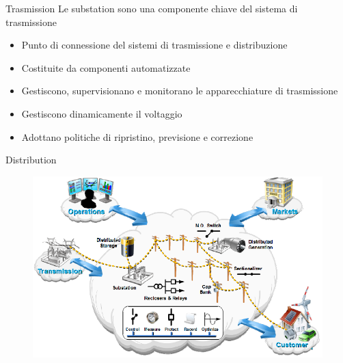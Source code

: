 \begin{frame}[fragile]{Trasmission}
	Le substation sono una componente chiave del sistema di trasmissione
	\begin{itemize}[<+- | alert@+>]
		\item Punto di connessione del sistemi di trasmissione e distribuzione
		\item Costituite da componenti automatizzate %
		\item Gestiscono, supervisionano e monitorano le apparecchiature di trasmissione %
		\item Gestiscono dinamicamente il voltaggio			
		\item Adottano politiche di ripristino, previsione e correzione   
	\end{itemize}
\end{frame}


\begin{frame}[fragile]{Distribution}
	\begin{figure}[h] 
		\includegraphics[scale=0.45]{imgs/distr.png}
	\end{figure}
\end{frame}
